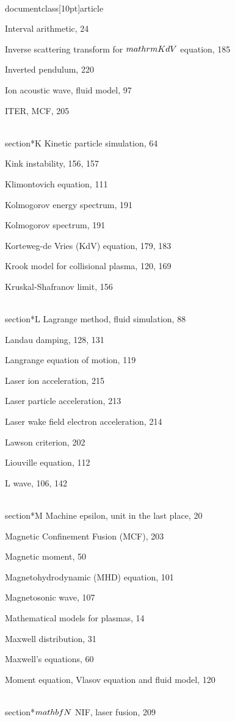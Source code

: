 \\documentclass[10pt]{article}
\begin{document}
{{{{{{Interval arithmetic, 24

Inverse scattering transform for $\\mathrm{KdV}$ equation, 185

Inverted pendulum, 220

Ion acoustic wave, fluid model, 97

ITER, MCF, 205

\\section*{K}
Kinetic particle simulation, 64

Kink instability, 156, 157

Klimontovich equation, 111

Kolmogorov energy spectrum, 191

Kolmogorov spectrum, 191

Korteweg-de Vries (KdV) equation, 179, 183

Krook model for collisional plasma, 120, 169

Kruskal-Shafranov limit, 156

\\section*{L}
Lagrange method, fluid simulation, 88

Landau damping, 128, 131

Langrange equation of motion, 119

Laser ion acceleration, 215

Laser particle acceleration, 213

Laser wake field electron acceleration, 214

Lawson criterion, 202

Liouville equation, 112

L wave, 106, 142

\\section*{M}
Machine epsilon, unit in the last place, 20

Magnetic Confinement Fusion (MCF), 203

Magnetic moment, 50

Magnetohydrodynamic (MHD) equation, 101

Magnetosonic wave, 107

Mathematical models for plasmas, 14

Maxwell distribution, 31

Maxwell's equations, 60

Moment equation, Vlasov equation and fluid model, 120

\\section*{$\\mathbf{N}$}
NIF, laser fusion, 209

}}}}}}
\end{document}
